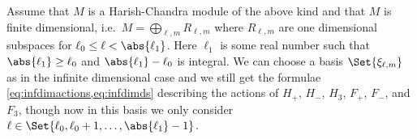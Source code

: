 Assume that $M$ is a Harish-Chandra module of the above kind and that $M$ is finite dimensional, i.e.\ $M=\bigoplus_{\ell,m} R_{\ell,m}$ where $R_{\ell,m}$ are one dimensional subspaces for $\ell_0\leq \ell < \abs{\ell_1}$. Here $\ell_1$ is some real number such that $\abs{\ell_1}\geq \ell_0$ and $\abs{\ell_1}-\ell_0$ is integral. We can choose a basis $\Set{\xi_{\ell,m}}$ as in the infinite dimensional case and we still get the formulae \cref{eq:infdimactions,eq:infdimds} describing the actions of $H_+$, $H_-$, $H_3$, $F_+$, $F_-$, and $F_3$, though now in this basis we only consider $\ell\in\Set{\ell_0,\ell_0+1,\dotsc,\abs{\ell_1}-1}$. 

